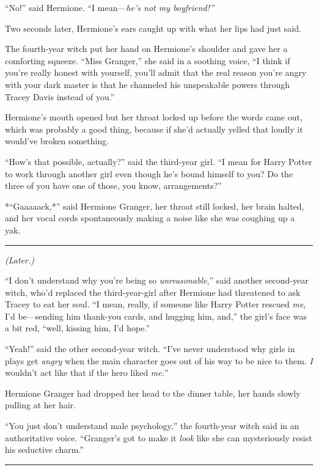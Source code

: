 ``No!'' said Hermione. ``I mean---\emph{he's not my boyfriend!''}

Two seconds later, Hermione's ears caught up with what her lips had just
said.

The fourth-year witch put her hand on Hermione's shoulder and gave her a
comforting squeeze. ``Miss Granger,'' she said in a soothing voice, ``I
think if you're really honest with yourself, you'll admit that the real
reason you're angry with your dark master is that he channeled his
unspeakable powers through Tracey Davis instead of you.''

Hermione's mouth opened but her throat locked up before the words came
out, which was probably a good thing, because if she'd actually yelled
that loudly it would've broken something.

``How's that possible, actually?'' said the third-year girl. ``I mean
for Harry Potter to work through another girl even though he's bound
himself to you? Do the three of you have one of those, you know,
arrangements?''

*``Gaaaaack,*'' said Hermione Granger, her throat still locked, her
brain halted, and her vocal cords spontaneously making a noise like she
was coughing up a yak.

\begin{center}\rule{3in}{0.4pt}\end{center}

\emph{(Later.)}

``I don't understand why you're being so \emph{unreasonable},'' said
another second-year witch, who'd replaced the third-year-girl after
Hermione had threatened to ask Tracey to eat her soul. ``I mean, really,
if someone like Harry Potter rescued \emph{me}, I'd be---sending him
thank-you cards, and hugging him, and,'' the girl's face was a bit red,
``well, kissing him, I'd hope.''

``Yeah!'' said the other second-year witch. ``I've never understood why
girls in plays get \emph{angry} when the main character goes out of his
way to be nice to them. \emph{I} wouldn't act like that if the hero
liked \emph{me.}''

Hermione Granger had dropped her head to the dinner table, her hands
slowly pulling at her hair.

``You just don't understand male psychology,'' the fourth-year witch
said in an authoritative voice. ``Granger's got to make it \emph{look}
like she can mysteriously resist his seductive charm.''

\begin{center}\rule{3in}{0.4pt}\end{center}

